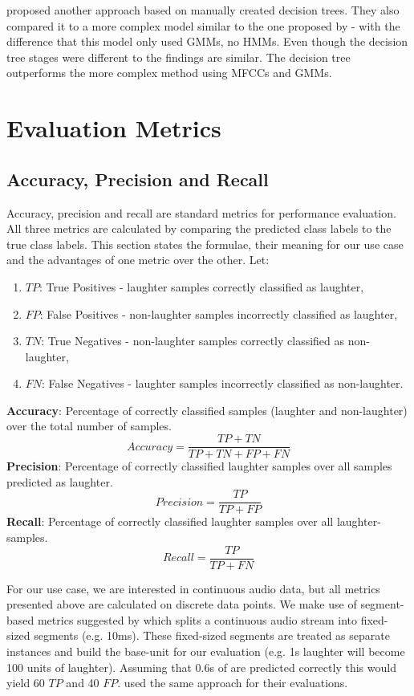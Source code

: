 \documentclass[bsc,frontabs,parskip,deptreport]{infthesis}
\begin{document}
\citet {manoj2011novel} proposed another approach based on manually created decision trees. They also compared it to a more complex model similar to the one proposed by \citet{cai2003highlight} - with the difference that this model only used GMMs, no HMMs.
Even though the decision tree stages were different to \citet{li2009characteristics} the findings are similar. The decision tree outperforms the more complex method using MFCCs and GMMs.  

\section{Evaluation Metrics} \label{theory}
\subsection{Accuracy, Precision and Recall} \label{sec:acc-prec-rec}
Accuracy, precision and recall are standard metrics for performance evaluation.
All three metrics are calculated by comparing the predicted class labels to the true class labels.
This section states the formulae, their meaning for our use case and the advantages of one metric over the other.
Let:
\begin{enumerate}
    \item $TP$: True Positives - laughter samples correctly classified as laughter,
    \item $FP$: False Positives - non-laughter samples incorrectly classified as laughter,
    \item $TN$: True Negatives - non-laughter samples correctly classified as non-laughter,
    \item $FN$: False Negatives - laughter samples incorrectly classified as non-laughter.
\end{enumerate}
\textbf{Accuracy}: Percentage of correctly classified samples (laughter and non-laughter) over the total number of samples.
$$Accuracy = \frac{TP+TN}{TP+TN+FP+FN}$$
\textbf{Precision}: Percentage of correctly classified laughter samples over all samples predicted as laughter.
$$Precision = \frac{TP}{TP+FP}$$
\textbf{Recall}: Percentage of correctly classified laughter samples over all laughter-samples.
$$Recall = \frac{TP}{TP+FN}$$

For our use case, we are interested in continuous audio data, but all metrics presented above are calculated on discrete data points. We make use of segment-based metrics suggested by \citet{mesaros2016metrics} which splits a continuous audio stream into fixed-sized segments (e.g. 10ms). These fixed-sized segments are treated as separate instances and build the base-unit for our evaluation (e.g. 1s laughter will become 100 units of laughter). Assuming that 0.6s of are predicted correctly this would yield 60 $TP$ and 40 $FP$.
\citet{gillick2021robust} used the same approach for their evaluations.
\end{document}
